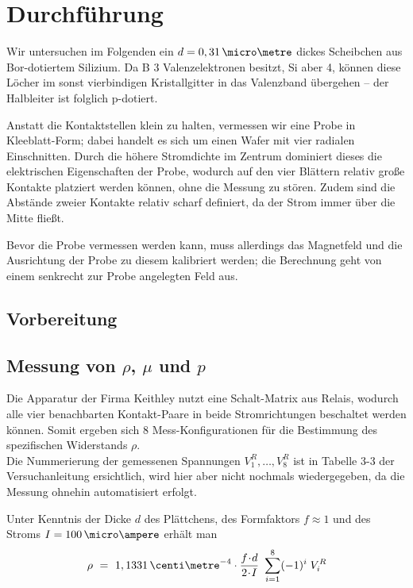 
\section{Durchführung}
Wir untersuchen im Folgenden ein $d = 0,31\,\micro\metre$ dickes Scheibchen aus Bor-dotiertem Silizium. Da \textsf{B} 3 Valenzelektronen besitzt, \textsf{Si} aber 4, können diese Löcher im sonst vierbindigen Kristallgitter in das Valenzband übergehen -- der Halbleiter ist folglich p-dotiert.

Anstatt die Kontaktstellen klein zu halten, vermessen wir eine Probe in Kleeblatt-Form; dabei handelt es sich um einen Wafer mit vier radialen Einschnitten. Durch die höhere Stromdichte im Zentrum dominiert dieses die elektrischen Eigenschaften der Probe, wodurch auf den vier \glqq Blättern\grqq{} relativ große Kontakte platziert werden können, ohne die Messung zu stören. Zudem sind die Abstände zweier Kontakte relativ scharf definiert, da der Strom immer über die Mitte fließt.

Bevor die Probe vermessen werden kann, muss allerdings das Magnetfeld und die Ausrichtung der Probe zu diesem kalibriert werden; die Berechnung geht von einem senkrecht zur Probe angelegten Feld aus.

\subsection{Vorbereitung}


\subsection{Messung von $\rho$, $\mu$ und $p$}

Die Apparatur der Firma Keithley nutzt eine Schalt-Matrix aus Relais, wodurch alle vier benachbarten Kontakt-Paare in beide Stromrichtungen beschaltet werden können. Somit ergeben sich 8 Mess-Konfigurationen für die Bestimmung des spezifischen Widerstands $\rho$.\\
Die Nummerierung der gemessenen Spannungen $V^R_1, \dots, V^R_8$ ist in Tabelle 3-3 der Versuchanleitung ersichtlich, wird hier aber nicht nochmals wiedergegeben, da die Messung ohnehin automatisiert erfolgt.

Unter Kenntnis der Dicke $d$ des Plättchens, des Formfaktors $f \approx 1$ und des Stroms  $I = 100\,\micro\ampere$ erhält man
\begin{equation}
\rho ~=~ 1,1331 \,\centi\metre^{-4} \cdot \frac{f \cdt d}{2 \cdt I} ~ \sum\limits_{i=1}^8 (-1)^i \; V^R_i
\end{equation}

